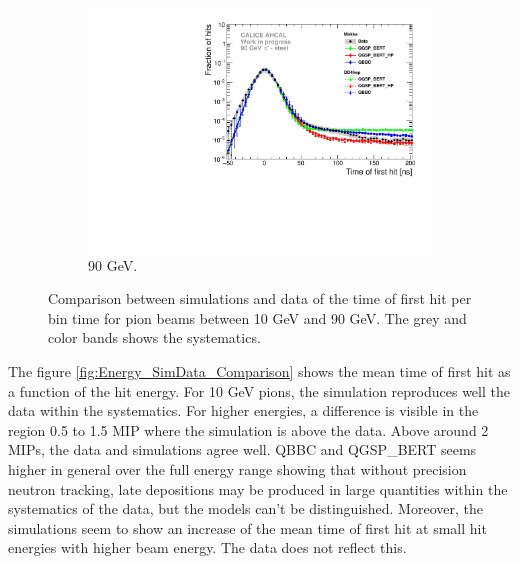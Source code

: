 \begin{figure}[htbp!]
\begin{subfigure}[t]{0.5\textwidth}
		\includegraphics[width=1\textwidth]{../Thesis_Plots/Timing/Pions/Plots/Comparison_SimData_Pion90GeV_LateClusters.pdf}
		\caption{90 GeV.} \label{fig:dNdt_SimData_90GeV}
	\end{subfigure}
	\caption{Comparison between simulations and data of the time of first hit per bin time for pion beams between 10 GeV and 90 GeV. The grey and color bands shows the systematics.}
	\label{fig:dNdt_SimData_Comparison}
\end{figure}

The figure \ref{fig:Energy_SimData_Comparison} shows the mean time of first hit as a function of the hit energy. For 10 GeV pions, the simulation reproduces well the data within the systematics. For higher energies, a difference is visible in the region 0.5 to 1.5 MIP where the simulation is above the data. Above around 2 MIPs, the data and simulations agree well. QBBC and QGSP\_BERT seems higher in general over the full energy range showing that without precision neutron tracking, late depositions may be produced in large quantities within the systematics of the data, but the models can't be distinguished.
Moreover, the simulations seem to show an increase of the mean time of first hit at small hit energies with higher beam energy. The data does not reflect this.


